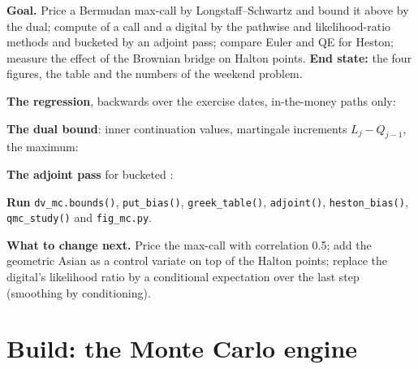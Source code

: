 \begin{tutorial}
\textbf{Goal.} Price a Bermudan max-call by Longstaff--Schwartz and bound it above by the dual; compute  of a call and a digital by the pathwise
and likelihood-ratio methods and bucketed  by an adjoint pass; compare Euler and QE for Heston; measure the effect of the Brownian bridge on Halton
points. \textbf{End state:} the four figures, the table and the numbers of the weekend problem.
\begin{tutsteps}
\item \textbf{The regression}, backwards over the exercise dates, in-the-money paths only:
\label{lst:dv:monte-carlo-pricers-in-practice:lsm}
\item \textbf{The dual bound}: inner continuation values, martingale increments $L_j-Q_{j-1}$, the maximum:
\label{lst:dv:monte-carlo-pricers-in-practice:dual}
\item \textbf{The adjoint pass} for bucketed :
\label{lst:dv:monte-carlo-pricers-in-practice:adjoint}
\item \textbf{Run} \texttt{dv\_mc.bounds()}, \texttt{put\_bias()}, \texttt{greek\_table()}, \texttt{adjoint()}, \texttt{heston\_bias()}, \texttt{qmc\_study()}
and \texttt{fig\_mc.py}.
\end{tutsteps}
\textbf{What to change next.} Price the max-call with correlation 0.5; add the geometric Asian as a control variate on top of the Halton points; replace the
digital's likelihood ratio by a conditional expectation over the last step (smoothing by conditioning).
\end{tutorial}

\section{Build: the Monte Carlo engine}\label{bld:dv:monte-carlo-pricers-in-practice:mcpricer}

